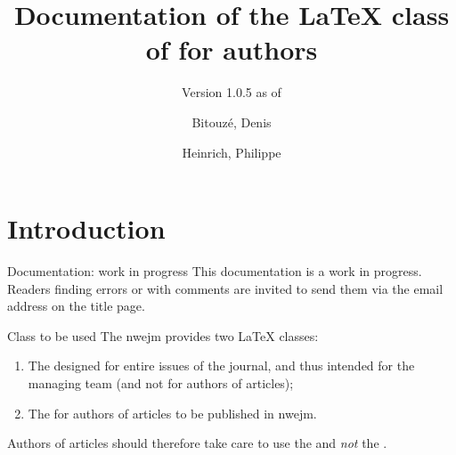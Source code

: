 \documentclass[english,nolocaltoc]{nwejmart}
\newcommand{\releaseversion}{1.0.5}
\newtheorem[style=definition]{fact}
\newtheorem[title=experience]{experience}
\newtheorem[title-plural=rings]{ring}
\newtheorem[title=ideal,title-plural=ideals]{ideal}
\begin{document}
\title[Documentation of the \LaTeX{} class of
\texorpdfstring{\nwejm}{NWEJM}]{Documentation of the \LaTeX{} class of \nwejm*{}
  for authors}%
%
\subtitle[Version \releaseversion{} (\DTMusedate{release-date})]{\small Version
  \releaseversion{} as of }%
%
\author[%
affiliation={%
  Université du Littoral Côte d'Opale, Laboratoire de math\'ematiques pures et
  appliqu\'ees (\nolinkurl{denis.bitouze@univ-littoral.fr})%
},%
]{Bitouzé, Denis}
\author[%
affiliation={%
  Université de Lille, Laboratoire Paul Painlevé UMR CNRS 8524 (\nolinkurl{philippe.heinrich@univ-lille.fr})%
},%
]{Heinrich, Philippe}
%
\maketitle
%
\etocarticlestylenomarks
\localtableofcontents
%

\section{Introduction}
\label{sec-introduction}

\begin{dbremark}{Documentation: work in progress}{}
This documentation is a work in progress. Readers finding errors or with comments are invited to send them via the email address on the title page.
\end{dbremark}

\begin{dbwarning}{Class to be used}{}
  The \gls{nwejm} provides two \LaTeX{} classes:
  \begin{enumerate}
  \item The \nwejmcl{} designed for entire issues of the journal, and thus intended for the \nwejm{} managing team (and not for authors of articles);
  \item The \nwejmauthorcl{} for authors of articles to be published in \gls{nwejm}.
  \end{enumerate}
  Authors of articles should therefore take care to use the \nwejmauthorcl{}
  and \emph{not} the \nwejmcl{}.
\end{dbwarning}
\end{document}
